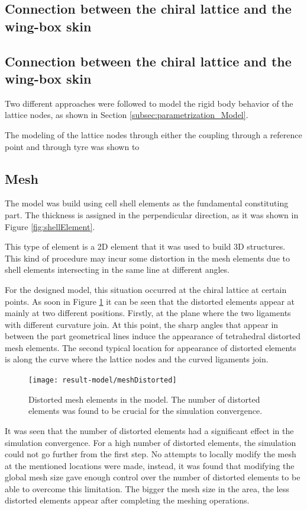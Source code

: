 \subsection{Connection between the chiral lattice and the wing-box skin} \label{subsec:connection_results_model}


\subsection{Connection between the chiral lattice and the wing-box skin} \label{subsec:connection_results_model}

Two different approaches were followed to model the rigid body behavior of the lattice nodes, as shown in Section \ref{subsec:parametrization_Model}.

The modeling of the lattice nodes through either the coupling through a reference point and through tyre was shown to 

\subsection{Mesh} \label{subsec:mesh_results_model}

The model was build using cell shell elements as the fundamental constituting part. The thickness is assigned in the perpendicular direction, as it was shown in Figure \ref{fig:shellElement}.

This type of element is a 2D element that it was used to build 3D structures. This kind of procedure may incur some distortion in the mesh elements due to shell elements intersecting in the same line at different angles. 

For the designed model, this situation occurred at the chiral lattice at certain points. As soon in Figure \ref{fig:meshDistorted} it can be seen that the distorted elements appear at mainly at two different positions. Firstly, at the plane where the two ligaments with different curvature join. At this point, the sharp angles that appear in between the part geometrical lines induce the appearance of tetrahedral distorted mesh elements. The second typical location for appearance of distorted elements is along the curve where the lattice nodes and the curved ligaments join.

\begin{figure}[!htpb]
  \centering
  \texttt{[image: result-model/meshDistorted]}
  \caption[Distorted mesh elements in the model]{Distorted mesh elements in the model. The number of distorted elements was found to be crucial for the simulation convergence.}\label{fig:meshDistorted}
\end{figure}

It was seen that the number of distorted elements had a significant effect in the simulation convergence. For a high number of distorted elements, the simulation could not go further from the first step. No attempts to locally modify the mesh at the mentioned locations were made, instead, it was found that modifying the global mesh size gave enough control over the number of distorted elements to be able to overcome this limitation. The bigger the mesh size in the area, the less distorted elements appear after completing the meshing operations.
